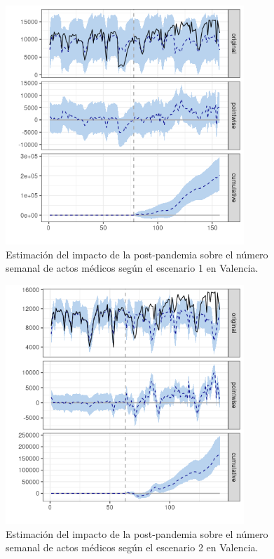 \documentclass[12pt,twoside]{article} %
\begin{document}
  \begin{center}
  \begin{figure}[H]
  \includegraphics[width=9cm]{global_post_scen1_Valencia.png}\caption{Estimación del impacto de la post-pandemia sobre el número semanal de actos médicos según el escenario 1 en Valencia.}
  \end{figure}
  \end{center}
  
  \begin{center}
    \begin{figure}[H]
      \includegraphics[width=9cm]{global_post_scen2_Valencia.png}\caption{Estimación del impacto de la post-pandemia sobre el número semanal de actos médicos según el escenario 2 en Valencia.}
    \end{figure}
    \end{center}
\end{document}
